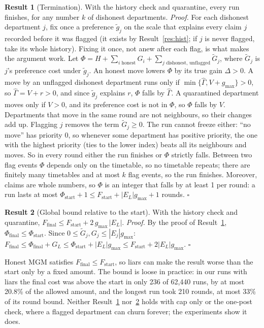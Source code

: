 \documentclass{article}
\theoremstyle{definition}
\newtheorem{result}{Result}
\newcommand{\1}{\mathbf{1}}
\newcommand{\gmax}{g_{\max}}
\begin{document}
\begin{result}[Termination]
\label{res:term}
With the history check and quarantine, every run finishes, for any number $k$ of dishonest departments.
\emph{Proof.} For each dishonest department $j$, fix once a preference $\tilde g_j$ on the scale that explains every claim $j$ recorded before it was flagged (it exists by Result~\ref{res:hist}; if $j$ is never flagged, take its whole history). Fixing it once, not anew after each flag, is what makes the argument work. Let
$\Phi=H+\sum_{i\text{ honest}}G_i+\sum_{j\text{ dishonest, unflagged}}\tilde G_j$, where $\tilde G_j$ is $j$'s preference cost under $\tilde g_j$.
An honest move lowers $\Phi$ by its true gain $\Delta>0$. A move by an unflagged dishonest department runs only if $\min\{\hat\Gamma,V+\gmax\}>0$, so $\hat\Gamma=V+r>0$, and since $\tilde g_j$ explains $r$, $\Phi$ falls by $\hat\Gamma$. A quarantined department moves only if $V>0$, and its preference cost is not in $\Phi$, so $\Phi$ falls by $V$. Departments that move in the same round are not neighbours, so their changes add up. Flagging $j$ removes the term $\tilde G_j\ge0$. The run cannot freeze either: ``no move'' has priority $0$, so whenever some department has positive priority, the one with the highest priority (ties to the lower index) beats all its neighbours and moves. So in every round either the run finishes or $\Phi$ strictly falls. Between two flag events $\Phi$ depends only on the timetable, so no timetable repeats; there are finitely many timetables and at most $k$ flag events, so the run finishes. Moreover, claims are whole numbers, so $\Phi$ is an integer that falls by at least 1 per round: a run lasts at most $\Phi_{\text{start}}+1\le F_{\text{start}}+|E_L|\gmax+1$ rounds. $\square$
\end{result}

\begin{result}[Global bound relative to the start]
\label{res:global}
With the history check and quarantine, $F_{\text{final}}\le F_{\text{start}}+2\,\gmax\,|E_L|$.
\emph{Proof.} By the proof of Result~\ref{res:term}, $\Phi_{\text{final}}\le\Phi_{\text{start}}$. Since $0\le\tilde G_j,G_j\le|E_j|\gmax$: $F_{\text{final}}\le\Phi_{\text{final}}+G_L\le\Phi_{\text{start}}+|E_L|\gmax\le F_{\text{start}}+2|E_L|\gmax$. $\square$
\end{result}
Honest MGM satisfies $F_{\text{final}}\le F_{\text{start}}$, so liars can make the result worse than the start only by a fixed amount. The bound is loose in practice: in our runs with liars the final cost was above the start in only 236 of 62{,}440 runs, by at most 20.8\% of the allowed amount, and the longest run took 210 rounds, at most 33\% of its round bound. Neither Result~\ref{res:term} nor~\ref{res:global} holds with cap only or the one-post check, where a flagged department can churn forever; the experiments show it does.
\end{document}
